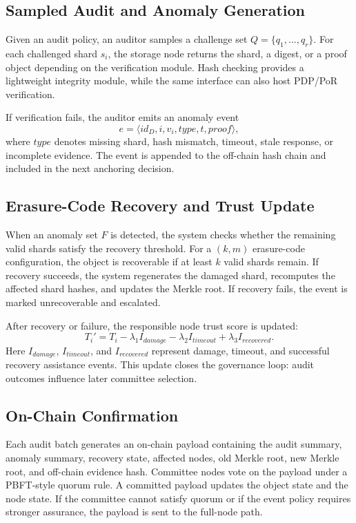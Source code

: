 \subsection{Sampled Audit and Anomaly Generation}

Given an audit policy, an auditor samples a challenge set $Q=\{q_1,\ldots,q_r\}$. For each challenged shard $s_i$, the storage node returns the shard, a digest, or a proof object depending on the verification module. Hash checking provides a lightweight integrity module, while the same interface can also host PDP/PoR verification.

If verification fails, the auditor emits an anomaly event
\begin{equation}
  e = \langle id_D, i, v_i, type, t, proof \rangle,
\end{equation}
where $type$ denotes missing shard, hash mismatch, timeout, stale response, or incomplete evidence. The event is appended to the off-chain hash chain and included in the next anchoring decision.

\subsection{Erasure-Code Recovery and Trust Update}

When an anomaly set $F$ is detected, the system checks whether the remaining valid shards satisfy the recovery threshold. For a $(k,m)$ erasure-code configuration, the object is recoverable if at least $k$ valid shards remain. If recovery succeeds, the system regenerates the damaged shard, recomputes the affected shard hashes, and updates the Merkle root. If recovery fails, the event is marked unrecoverable and escalated.

After recovery or failure, the responsible node trust score is updated:
\begin{equation}
  T_i' = T_i - \lambda_1 I_{damage} - \lambda_2 I_{timeout} + \lambda_3 I_{recovered}.
\end{equation}
Here $I_{damage}$, $I_{timeout}$, and $I_{recovered}$ represent damage, timeout, and successful recovery assistance events. This update closes the governance loop: audit outcomes influence later committee selection.

\subsection{On-Chain Confirmation}

Each audit batch generates an on-chain payload containing the audit summary, anomaly summary, recovery state, affected nodes, old Merkle root, new Merkle root, and off-chain evidence hash. Committee nodes vote on the payload under a PBFT-style quorum rule. A committed payload updates the object state and the node state. If the committee cannot satisfy quorum or if the event policy requires stronger assurance, the payload is sent to the full-node path.
